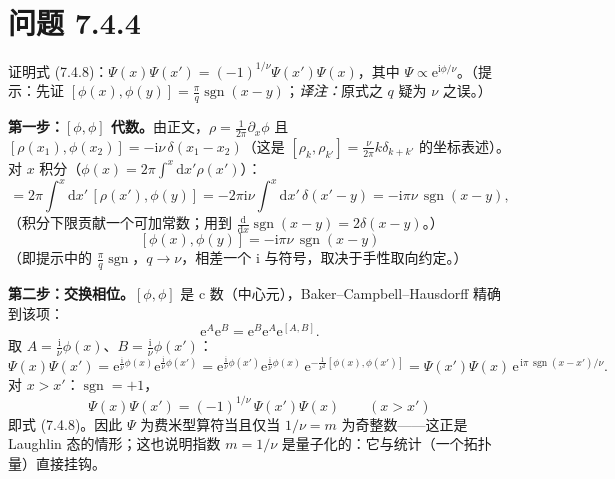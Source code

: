 \section*{问题 7.4.4}
\begin{problem}
证明式 (7.4.8)：$\Psi(x)\Psi(x')=(-1)^{1/\nu}\Psi(x')\Psi(x)$，其中 $\Psi\propto\mathrm{e}^{\mathrm{i}\phi/\nu}$。（提示：先证 $[\phi(x),\phi(y)]=\frac{\pi}{q}\operatorname{sgn}(x-y)$；\emph{译注：}原式之 $q$ 疑为 $\nu$ 之误。）
\end{problem}
\solution
\textbf{第一步：$[\phi,\phi]$ 代数。}由正文，$\rho=\frac{1}{2\pi}\partial_x\phi$ 且 $[\rho(x_1),\phi(x_2)]=-\mathrm{i}\nu\,\delta(x_1-x_2)$（这是 $[\rho_k,\rho_{k'}]=\frac{\nu}{2\pi}k\delta_{k+k'}$ 的坐标表述）。对 $x$ 积分（$\phi(x)=2\pi\int^x\mathrm{d}x'\rho(x')$）：
\begin{equation*}
[\phi(x),\phi(y)]=2\pi\int^x\!\mathrm{d}x'\,[\rho(x'),\phi(y)]
=-2\pi\mathrm{i}\nu\!\int^x\!\mathrm{d}x'\,\delta(x'-y)
=-\mathrm{i}\pi\nu\,\operatorname{sgn}(x-y),
\end{equation*}
（积分下限贡献一个可加常数；用到 $\frac{\mathrm{d}}{\mathrm{d}x}\operatorname{sgn}(x-y)=2\delta(x-y)$。）
\begin{equation*}
\boxed{\;[\phi(x),\phi(y)]=-\mathrm{i}\pi\nu\,\operatorname{sgn}(x-y)\;}
\end{equation*}
（即提示中的 $\frac{\pi}{q}\operatorname{sgn}$，$q\to\nu$，相差一个 $\mathrm{i}$ 与符号，取决于手性取向约定。）

\textbf{第二步：交换相位。}$[\phi,\phi]$ 是 c 数（中心元），Baker--Campbell--Hausdorff 精确到该项：
\begin{equation*}
\mathrm{e}^{A}\mathrm{e}^{B}=\mathrm{e}^{B}\mathrm{e}^{A}\mathrm{e}^{[A,B]} .
\end{equation*}
取 $A=\frac{\mathrm{i}}{\nu}\phi(x)$、$B=\frac{\mathrm{i}}{\nu}\phi(x')$：
\begin{equation*}
\Psi(x)\Psi(x')
=\mathrm{e}^{\frac{\mathrm{i}}{\nu}\phi(x)}\mathrm{e}^{\frac{\mathrm{i}}{\nu}\phi(x')}
=\mathrm{e}^{\frac{\mathrm{i}}{\nu}\phi(x')}\mathrm{e}^{\frac{\mathrm{i}}{\nu}\phi(x)}
\,\mathrm{e}^{-\frac{1}{\nu^2}[\phi(x),\phi(x')]}
=\Psi(x')\Psi(x)\,\mathrm{e}^{\,\mathrm{i}\pi\,\operatorname{sgn}(x-x')/\nu}.
\end{equation*}
对 $x>x'$：$\operatorname{sgn}=+1$，
\begin{equation*}
\boxed{\;\Psi(x)\Psi(x')=(-1)^{1/\nu}\,\Psi(x')\Psi(x)\qquad(x>x')\;}
\end{equation*}
即式 (7.4.8)。因此 $\Psi$ 为费米型算符当且仅当 $1/\nu=m$ 为奇整数——这正是 Laughlin 态的情形；这也说明指数 $m=1/\nu$ 是量子化的：它与统计（一个拓扑量）直接挂钩。


